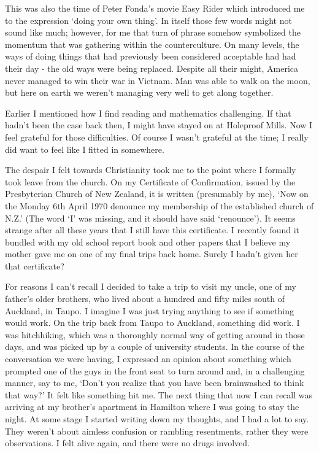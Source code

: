 \enlargethispage*{\baselineskip}

This was also the time of Peter Fonda's movie Easy Rider which
introduced me to the expression `doing your own thing'. In itself those
few words might not sound like much; however, for me that turn of phrase
somehow symbolized the momentum that was gathering within the
counterculture. On many levels, the ways of doing things that had
previously been considered acceptable had had their day - the old ways were being replaced. Despite all their
might, America never managed to win their war in Vietnam. Man was able
to walk on the moon, but here on earth we weren't managing very well to
get along together.

Earlier I mentioned how I find reading and mathematics challenging. If
that hadn't been the case back then, I might have stayed on at Holeproof
Mills. Now I feel grateful for those difficulties. Of course I wasn't
grateful at the time; I really did want to feel like I fitted in
somewhere.

The despair I felt towards Christianity took me to the point where I
formally took leave from the church. On my Certificate of Confirmation,
issued by the Presbyterian Church of New Zealand, it is written
(presumably by me), `Now on the Monday 6th April 1970 denounce my
membership of the established church of N.Z.' (The word `I' was missing,
and it should have said `renounce'). It seems strange after all these
years that I still have this certificate. I recently found it bundled
with my old school report book and other papers that I believe my mother
gave me on one of my final trips back home. Surely I hadn't given her
that certificate?

\enlargethispage*{\baselineskip}

For reasons I can't recall I decided to take a trip to visit my uncle,
one of my father's older brothers, who lived about a hundred and fifty
miles south of Auckland, in Taupo\cite{taupo}.
I imagine I was just trying anything to see if something would work. On
the trip back from Taupo to Auckland, something did work. I was
hitchhiking, which was a thoroughly normal way of getting around in
those days, and was picked up by a couple of university students. In the
course of the conversation we were having, I expressed an opinion about
something which prompted one of the guys in the front seat to turn
around and, in a challenging manner, say to me, `Don't you realize that
you have been brainwashed to think that way?' It felt like something hit
me. The next thing that now I can recall was arriving at my brother's
apartment in Hamilton where I was going to stay the night. At some stage
I started writing down my thoughts, and I had a lot to say. They weren't
about aimless confusion or rambling resentments, rather they were
observations. I felt alive again, and there were no drugs involved.

